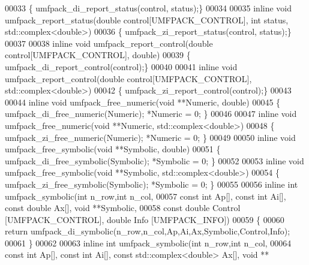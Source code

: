 \begin{DoxyCode}
00033 \{ umfpack\_di\_report\_status(control, status);\}
00034 
00035 \textcolor{keyword}{inline} \textcolor{keywordtype}{void} umfpack\_report\_status(\textcolor{keywordtype}{double} control[UMFPACK\_CONTROL], \textcolor{keywordtype}{int} status, std::complex<double>)
00036 \{ umfpack\_zi\_report\_status(control, status);\}
00037 
00038 \textcolor{keyword}{inline} \textcolor{keywordtype}{void} umfpack\_report\_control(\textcolor{keywordtype}{double} control[UMFPACK\_CONTROL], \textcolor{keywordtype}{double})
00039 \{ umfpack\_di\_report\_control(control);\}
00040 
00041 \textcolor{keyword}{inline} \textcolor{keywordtype}{void} umfpack\_report\_control(\textcolor{keywordtype}{double} control[UMFPACK\_CONTROL], std::complex<double>)
00042 \{ umfpack\_zi\_report\_control(control);\}
00043 
00044 \textcolor{keyword}{inline} \textcolor{keywordtype}{void} umfpack\_free\_numeric(\textcolor{keywordtype}{void} **Numeric, \textcolor{keywordtype}{double})
00045 \{ umfpack\_di\_free\_numeric(Numeric); *Numeric = 0; \}
00046 
00047 \textcolor{keyword}{inline} \textcolor{keywordtype}{void} umfpack\_free\_numeric(\textcolor{keywordtype}{void} **Numeric, std::complex<double>)
00048 \{ umfpack\_zi\_free\_numeric(Numeric); *Numeric = 0; \}
00049 
00050 \textcolor{keyword}{inline} \textcolor{keywordtype}{void} umfpack\_free\_symbolic(\textcolor{keywordtype}{void} **Symbolic, \textcolor{keywordtype}{double})
00051 \{ umfpack\_di\_free\_symbolic(Symbolic); *Symbolic = 0; \}
00052 
00053 \textcolor{keyword}{inline} \textcolor{keywordtype}{void} umfpack\_free\_symbolic(\textcolor{keywordtype}{void} **Symbolic, std::complex<double>)
00054 \{ umfpack\_zi\_free\_symbolic(Symbolic); *Symbolic = 0; \}
00055 
00056 \textcolor{keyword}{inline} \textcolor{keywordtype}{int} umfpack\_symbolic(\textcolor{keywordtype}{int} n\_row,\textcolor{keywordtype}{int} n\_col,
00057                             \textcolor{keyword}{const} \textcolor{keywordtype}{int} Ap[], \textcolor{keyword}{const} \textcolor{keywordtype}{int} Ai[], \textcolor{keyword}{const} \textcolor{keywordtype}{double} Ax[], \textcolor{keywordtype}{void} **Symbolic,
00058                             \textcolor{keyword}{const} \textcolor{keywordtype}{double} Control [UMFPACK\_CONTROL], \textcolor{keywordtype}{double} Info [UMFPACK\_INFO])
00059 \{
00060   \textcolor{keywordflow}{return} umfpack\_di\_symbolic(n\_row,n\_col,Ap,Ai,Ax,Symbolic,Control,Info);
00061 \}
00062 
00063 \textcolor{keyword}{inline} \textcolor{keywordtype}{int} umfpack\_symbolic(\textcolor{keywordtype}{int} n\_row,\textcolor{keywordtype}{int} n\_col,
00064                             \textcolor{keyword}{const} \textcolor{keywordtype}{int} Ap[], \textcolor{keyword}{const} \textcolor{keywordtype}{int} Ai[], \textcolor{keyword}{const} std::complex<double> Ax[], \textcolor{keywordtype}{void} **

\end{DoxyCode}
